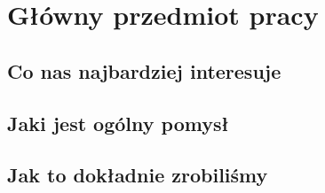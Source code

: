 \chapter{Główny przedmiot pracy}
\section{Co nas najbardziej interesuje}

\section{Jaki jest ogólny pomysł}

\section{Jak to dokładnie zrobiliśmy}

